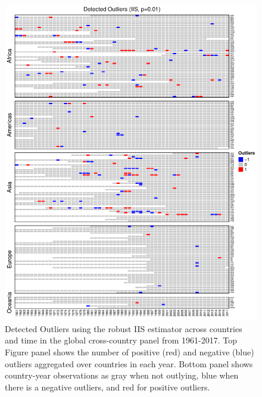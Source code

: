\documentclass[11pt, letterpaper]{article}
\numberwithin{algorithm}{section}
\numberwithin{assumption}{section}
\numberwithin{lemma}{section}
\numberwithin{theorem}{section}
\numberwithin{corollary}{section}
\numberwithin{remark}{section}
\numberwithin{equation}{section}
\numberwithin{figure}{section}
\numberwithin{table}{section}
\begin{document}
\begin{figure}[!htbp]  \vspace{-.35in}
\centering
\includegraphics[width = \textwidth]{heat1_adapt.pdf}
\caption{Detected Outliers using the robust IIS estimator across countries and time in the global cross-country panel from 1961-2017. Top Figure panel shows the number of positive (red) and negative (blue) outliers aggregated over countries in each year. Bottom panel shows country-year observations as gray when not outlying, blue when there is a negative outliers, and red for positive outliers.}
\label{fig_out_app1}
\end{figure}
\end{document}
